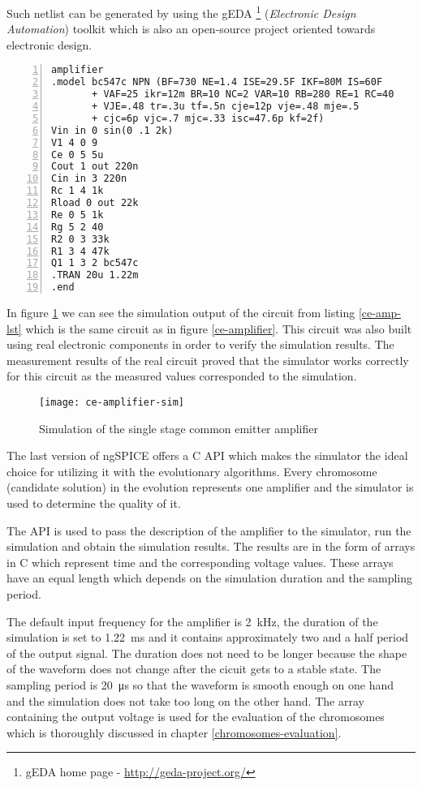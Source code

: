 Such netlist can be generated by using the gEDA \footnote{gEDA home page - \url{http://geda-project.org/}} (\textit{Electronic Design Automation}) toolkit which is also an open-source project oriented towards electronic design.

\begin{lstlisting}[caption={description of the common emitter amplifier using the SPICE syntax},
    label={ce-amp-lst},
    captionpos=b,
    numbers=left]
 amplifier
.model bc547c NPN (BF=730 NE=1.4 ISE=29.5F IKF=80M IS=60F
       + VAF=25 ikr=12m BR=10 NC=2 VAR=10 RB=280 RE=1 RC=40
       + VJE=.48 tr=.3u tf=.5n cje=12p vje=.48 mje=.5
       + cjc=6p vjc=.7 mjc=.33 isc=47.6p kf=2f)
Vin in 0 sin(0 .1 2k)
V1 4 0 9
Ce 0 5 5u
Cout 1 out 220n
Cin in 3 220n
Rc 1 4 1k
Rload 0 out 22k
Re 0 5 1k
Rg 5 2 40
R2 0 3 33k
R1 3 4 47k
Q1 1 3 2 bc547c
.TRAN 20u 1.22m
.end
\end{lstlisting}

In figure \ref{ce-amplifier-sim} we can see the simulation output of the circuit from listing \ref{ce-amp-lst} which is the same circuit as in figure \ref{ce-amplifier}. This circuit was also built using real electronic components in order to verify the simulation results. The measurement results of the real circuit proved that the simulator works correctly for this circuit as the measured values corresponded to the simulation.

\begin{figure}[!ht]
    \centering
    \texttt{[image: ce-amplifier-sim]}\label{ce-amplifier-sim}
    \caption{Simulation of the single stage common emitter amplifier}
\end{figure}

The last version of ngSPICE offers a C API which makes the simulator the ideal choice for utilizing it with the evolutionary algorithms. Every chromosome (candidate solution) in the evolution represents one amplifier and the simulator is used to determine the quality of it.

The API is used to pass the description of the amplifier to the simulator, run the simulation and obtain the simulation results. The results are in the form of arrays in C which represent time and the corresponding voltage values. These arrays have an equal length which depends on the simulation duration and the sampling period.

The default input frequency for the amplifier is \SI{2}{\kilo\hertz}, the duration of the simulation is set to \SI{1.22}{\milli\second} and it contains approximately two and a half period of the output signal. The duration does not need to be longer because the shape of the waveform does not change after the cicuit gets to a stable state. The sampling period is \SI{20}{\micro\second} so that the waveform is smooth enough on one hand and the simulation does not take too long on the other hand. The array containing the output voltage is used for the evaluation of the chromosomes which is thoroughly discussed in chapter \ref{chromosomes-evaluation}.


